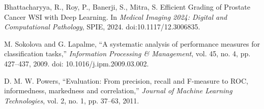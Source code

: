Bhattacharyya, R., Roy, P., Banerji, S., Mitra, S.  
\newblock Efficient Grading of Prostate Cancer WSI with Deep Learning.  
\newblock In {\em Medical Imaging 2024: Digital and Computational Pathology}, SPIE, 2024.  
\newblock doi:10.1117/12.3006835.

M. Sokolova and G. Lapalme,
``A systematic analysis of performance measures for classification tasks,''
\textit{Information Processing \& Management},
vol. 45, no. 4, pp. 427--437, 2009.
doi: 10.1016/j.ipm.2009.03.002.

D. M. W. Powers,
``Evaluation: From precision, recall and F-measure to ROC, informedness, markedness and correlation,''
\textit{Journal of Machine Learning Technologies},
vol. 2, no. 1, pp. 37--63, 2011.